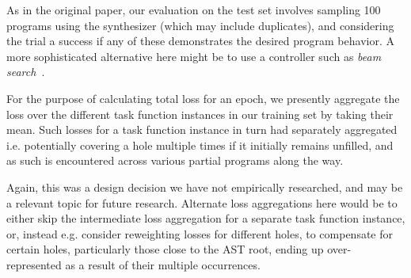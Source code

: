 \documentclass{article}
\begin{document}
As in the original paper,
our evaluation on the test set involves sampling 100 programs using the synthesizer (which may include duplicates),
and considering the trial a success if any of these demonstrates the desired program behavior.
A more sophisticated alternative here might be to use a controller such as \emph{beam search}~\citep{polosukhin2018neural}.


For the purpose of calculating total loss for an epoch,
we presently aggregate the loss over the different
task function instances in our training set by taking their mean.
Such losses for a task function instance in turn had separately aggregated
i.e. potentially covering a hole multiple times if it initially remains unfilled,
and as such is encountered across various partial programs along the way.

Again, this was a design decision we have not empirically researched,
and may be a relevant topic for future research.
Alternate loss aggregations here would be to either
skip the intermediate loss aggregation for a separate task function instance,
or, instead e.g. consider reweighting losses for different holes,
to compensate for certain holes, particularly those close to the AST root,
ending up over-represented as a result of their multiple occurrences.


\end{document}
